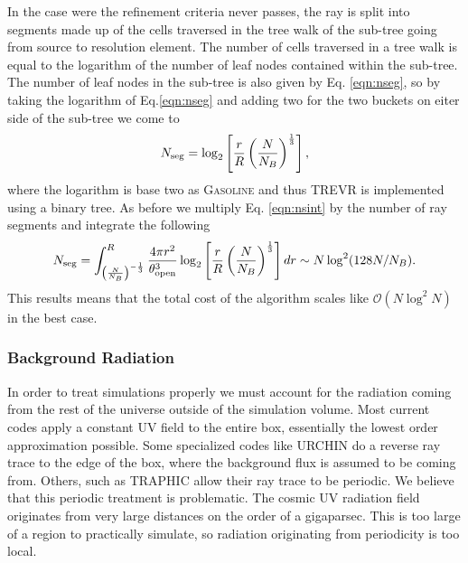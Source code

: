 \documentclass[fleq,usenatbib]{mnras}
\newcommand{\acro}{TREVR}
\newcommand{\bigO}[1]{\mathcal{O}\left(#1\right)}
\newcommand{\tO}{\theta_{\rm open}}
\begin{document}
In the case were the refinement criteria never passes, the ray is split into 
segments made up of the cells traversed in the tree walk of the sub-tree going 
from source to resolution element. The number of cells traversed in a tree walk
is equal to the logarithm of the number of leaf nodes contained within the 
sub-tree. The number of leaf nodes in the sub-tree is also given by Eq. 
\ref{eqn:nseg}, so by taking the logarithm of Eq.\ref{eqn:nseg} and adding two 
for the two buckets on eiter side of the sub-tree we come to
\begin{equation}
\label{eqn:nseg2}
N_{\rm seg} = \log_2\left[\frac{r}{R}\left(
\frac{N}{N_B}\right)^\frac{1}{3}\right],
\end{equation}
where the logarithm is base two as \textsc{Gasoline} and thus \acro{} is 
implemented using a binary tree. As before we multiply Eq. \ref{eqn:nsint} 
by the number of ray segments and integrate the following
\begin{equation}
\label{eqn:nsegint2}
N_{\rm seg} = \int_{\left(\frac{N}{N_B}\right)^{-\frac{1}{3}}}^R 
\frac{4\pi r^2}{\tO^3}
\log_2\left[\frac{r}{R}\left(
\frac{N}{N_B}\right)^\frac{1}{3}\right] dr
\sim N\log^2(128 N/N_B).
\end{equation}
This results means that the total cost of the algorithm scales like 
$\bigO{N\log^2N}$ in the best case.

\subsubsection{Background Radiation}
In order to treat simulations properly we must account for the radiation 
coming from the rest of the universe outside of the simulation volume. Most 
current codes apply a constant UV field to the entire box, essentially the 
lowest order approximation possible. Some specialized codes like URCHIN 
\citep{altayTheuns13} do a reverse ray trace to the edge of the box, where the 
background flux is assumed to be coming from. Others, such as TRAPHIC 
\citep{pawlikSchaye08} allow their ray trace to be periodic. We believe
that this periodic treatment is problematic. The cosmic UV radiation field 
originates from very large distances on the order of a gigaparsec. This is too 
large of a region to practically simulate, so radiation originating from 
periodicity is too local.
\end{document}
